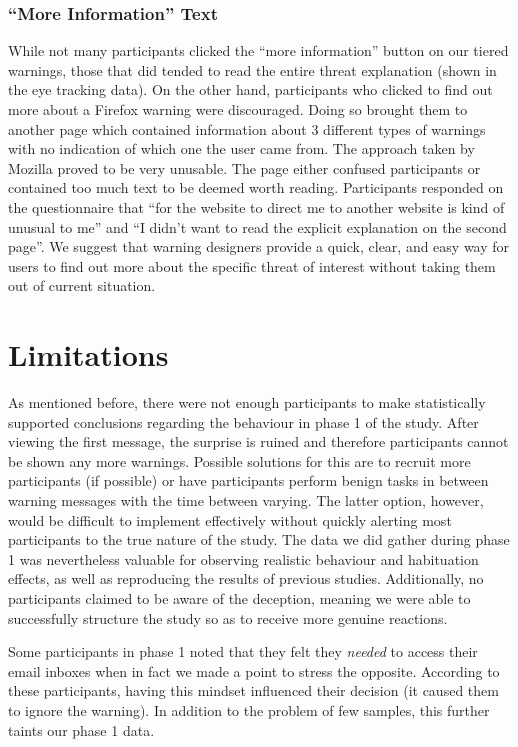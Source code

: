 \pagebreak
\subsubsection{``More Information'' Text}
While not many participants clicked the ``more information'' button on our tiered warnings, those that did tended to read the entire threat explanation (shown in the eye tracking data). On the other hand, participants who clicked to find out more about a Firefox warning were discouraged. Doing so brought them to another page which contained information about 3 different types of warnings with no indication of which one the user came from. The approach taken by Mozilla proved to be very unusable. The page either confused participants or contained too much text to be deemed worth reading. Participants responded on the questionnaire that ``for the website to direct me to another website is kind of unusual to me'' and ``I didn't want to read the explicit explanation on the second page''. We suggest that warning designers provide a quick, clear, and easy way for users to find out more about the specific threat of interest without taking them out of current situation.


\section{Limitations}
As mentioned before, there were not enough participants to make statistically supported conclusions regarding the behaviour in phase 1 of the study. After viewing the first message, the surprise is ruined and therefore participants cannot be shown any more warnings. Possible solutions for this are to recruit more participants (if possible) or have participants perform benign tasks in between warning messages with the time between varying. The latter option, however, would be difficult to implement effectively without quickly alerting most participants to the true nature of the study. The data we did gather during phase 1 was nevertheless valuable for observing realistic behaviour and habituation effects, as well as reproducing the results of previous studies. Additionally, no participants claimed to be aware of the deception, meaning we were able to successfully structure the study so as to receive more genuine reactions.

Some participants in phase 1 noted that they felt they \emph{needed} to access their email inboxes when in fact we made a point to stress the opposite. According to these participants, having this mindset influenced their decision (it caused them to ignore the warning). In addition to the problem of few samples, this further taints our phase 1 data.

